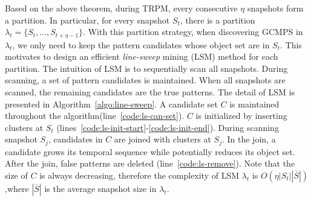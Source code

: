 Based on the above theorem, during TRPM, every consecutive $\eta$ snapshots
form a partition. In particular, for every snapshot $S_t$, there is
a partition $\lambda_t=\{S_t,...,S_{t+\eta-1}\}$. With this partition strategy,
when discovering GCMPS in $\lambda_t$, we only need to keep the pattern candidates whose
object set are in $S_t$. This motivates to design an efficient 
\emph{line-sweep} mining (LSM) method for each partition. The intuition of LSM is 
to sequentially scan all snapshots. During scanning, a set of pattern candidates is maintained.
When all snapshots are scanned, the remaining candidates are the true patterns.
The detail of LSM is presented in Algorithm~\ref{algo:line-sweep}.
A candidate set $C$ is maintained throughout the algorithm(line~\ref{code:ls-can-set}). $C$
is initialized by inserting clusters at $S_t$ (lines~\ref{code:ls-init-start}-\ref{code:ls-init-end}).
During scanning snapshot $S_j$, candidates in $C$ are joined with clusters at $S_j$. In
the join, a candidate grows its temporal sequence while potentially reduces its object set. After the join,
false patterns are deleted (line~\ref{code:ls-remove}). 
Note that the size of $C$ is always decreasing, therefore the complexity of LSM $\lambda_t$ is $O(\eta|S_t||\overline{S}|)$,where $|\overline{S}|$ is the average snapshot size in $\lambda_t$.





